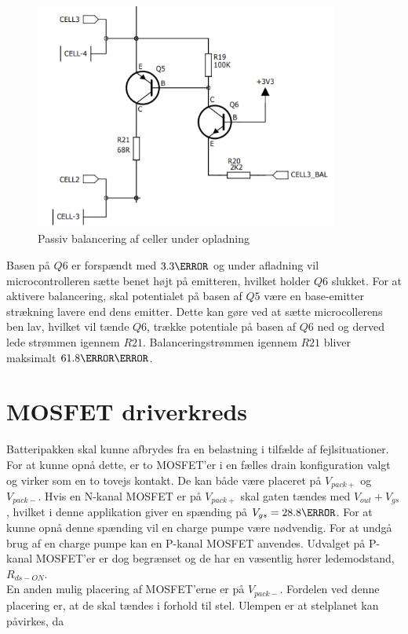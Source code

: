 \begin{figure}[h]
	\centering
	\includegraphics[width=10cm]{billeder/balance.png}
	\caption{Passiv balancering af celler under opladning}
	\label{fig:passiv_balancering}
\end{figure}

Basen på $Q6$ er forspændt med $3.3\volt$ og under afladning vil microcontrolleren sætte benet højt på emitteren, hvilket holder $Q6$ slukket. For at aktivere balancering, skal potentialet på basen af $Q5$ være en base-emitter strækning lavere end dens emitter. Dette kan gøre ved at sætte microcollerens ben lav, hvilket vil tænde $Q6$, trække potentiale på basen af $Q6$ ned og derved lede strømmen igennem $R21$. Balanceringstrømmen igennem $R21$ bliver maksimalt $61.8\milli\ampere$.

\section{MOSFET driverkreds}
Batteripakken skal kunne afbrydes fra en belastning i tilfælde af fejlsituationer. For at kunne opnå dette, er to MOSFET'er i en fælles drain konfiguration valgt og virker som en to tovejs kontakt. De kan både være placeret på $V_{pack+}$ og $V_{pack-}$. Hvis en N-kanal MOSFET er på $V_{pack+}$ skal gaten tændes med $V_{out} + V_{gs}$, hvilket i denne applikation giver en spænding på $V_{gs} = 28.8\volt$. For at kunne opnå denne spænding vil en charge pumpe være nødvendig. For at undgå brug af en charge pumpe kan en P-kanal MOSFET anvendes. Udvalget på P-kanal MOSFET'er er dog begrænset og de har en væsentlig hører ledemodstand, $R_{ds-ON}$. 
\\

En anden mulig placering af MOSFET'erne er på $V_{pack-}$. Fordelen ved denne placering er, at de skal tændes i forhold til stel. Ulempen er at stelplanet kan påvirkes, da 

